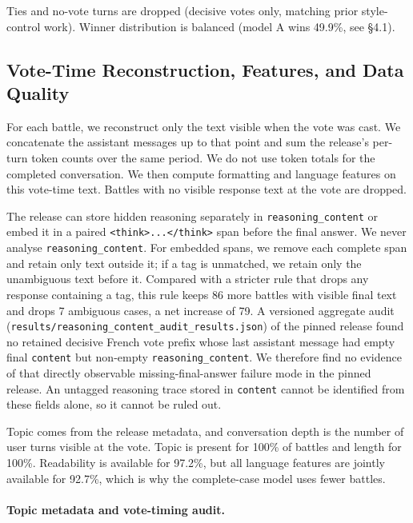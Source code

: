 \documentclass[
]{article}
\begin{document}
Ties and no-vote turns are dropped (decisive votes only, matching prior
style-control work). Winner distribution is balanced (model A wins
49.9\%, see §4.1).

\subsection{Vote-Time Reconstruction, Features, and Data
Quality}\label{feature-extraction-and-data-quality}

For each battle, we reconstruct only the text visible when the vote was
cast. We concatenate the assistant messages up to that point and sum the
release's per-turn token counts over the same period. We do not use
token totals for the completed conversation. We then compute formatting
and language features on this vote-time text. Battles with no visible
response text at the vote are dropped.

The release can store hidden reasoning separately in
\texttt{reasoning\_content} or embed it in a paired
\texttt{\textless think\textgreater...\textless/think\textgreater} span
before the final answer. We never analyse \texttt{reasoning\_content}.
For embedded spans, we remove each complete span and retain only text
outside it; if a tag is unmatched, we retain only the unambiguous text
before it. Compared with a stricter rule that drops any response
containing a tag, this rule keeps 86 more battles with visible final text
and drops 7 ambiguous cases, a net increase of 79. A versioned aggregate audit
(\texttt{results/reasoning\_content\_audit\_results.json}) of the pinned
release found no retained decisive French vote prefix whose last
assistant message had empty final \texttt{content} but non-empty
\texttt{reasoning\_content}. We therefore find no evidence of that directly observable
missing-final-answer failure mode in the pinned release. An untagged
reasoning trace stored in \texttt{content} cannot be identified from
these fields alone, so it cannot be ruled out.

Topic comes from the release metadata, and conversation depth is the
number of user turns visible at the vote. Topic is present for 100\% of
battles and length for 100\%. Readability is available
for 97.2\%, but all language features are jointly available for 92.7\%,
which is why the complete-case model uses fewer battles.

\paragraph{Topic metadata and vote-timing audit.}\label{native-topic-metadata-and-vote-timing-audit}
\end{document}
